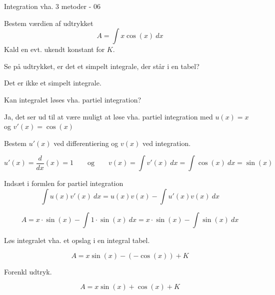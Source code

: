 \documentclass{article}
\begin{document}
\newpage

\begin{exercise}{Integration vha. 3 metoder - 06}

Bestem værdien af udtrykket
\[
A = \int x \cos(x) \ dx
\]
Kald en evt. ukendt konstant for $K$.


\hint
Se på udtrykket, er det et simpelt integrale, der står i en tabel?

\hint
Det er ikke et simpelt integrale.

\hint
Kan integralet løses vha. partiel integration?

\hint
Ja, det ser ud til at være muligt at løse vha. partiel integration med $u(x)=x$ og $v'(x)=\cos(x)$

\hint
Bestem $u'(x)$ ved differentiering og $v(x)$ ved integration.

\hint
\[
u'(x) = \frac{d}{dx} \left( x \right) = 1 \qquad \textrm{og} \qquad v(x) = \int v'(x) \ dx = \int \cos(x) \ dx = \sin(x)
\]

\hint
Indsæt i formlen for partiel integration
\[
\int u(x) v'(x) \ dx = u(x) v(x) - \int u'(x) v(x) \ dx
\]

\hint
\[
A = x \cdot \sin(x) - \int 1 \cdot \sin(x) \ dx = x \cdot \sin(x) - \int \sin(x) \ dx
\]

\hint
Løs integralet vha. et opslag i en integral tabel.

\hint
\[
A = x \sin(x) - (- \cos(x)) + K
\]

\hint
Forenkl udtryk.

\hint
\[
A = x \sin(x) + \cos(x) + K
\]

\end{exercise}

\newpage
\end{document}
